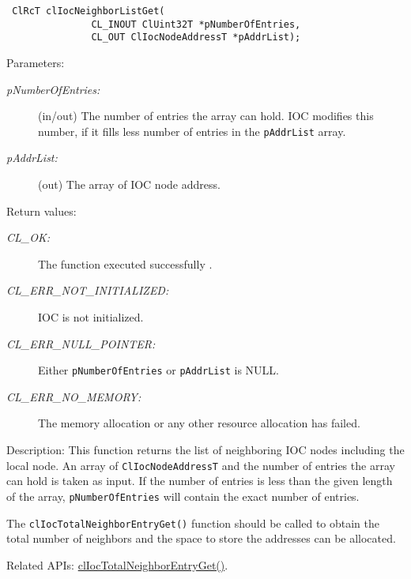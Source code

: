 \begin{flushleft}
\begin{Desc}
\footnotesize\begin{verbatim} ClRcT clIocNeighborListGet( 
               CL_INOUT ClUint32T *pNumberOfEntries, 
               CL_OUT ClIocNodeAddressT *pAddrList); 
\end{verbatim}
\normalsize
\end{Desc}
\begin{Desc}
\item[Parameters:]
\begin{description}
\item[{\em p\-Number\-Of\-Entries:}](in/out) The number of entries the array can hold. IOC modifies this number, if it fills less
number of entries in the {\tt{p\-Addr\-List}} array.
\item[{\em p\-Addr\-List:}](out) The array of IOC node address.\end{description}
\end{Desc}
\begin{Desc}
\item[Return values:]
\begin{description}
\item[{\em CL\_\-OK:}]The function executed successfully . \item[{\em CL\_\-ERR\_\-NOT\_\-INITIALIZED:}] IOC is not initialized. 
\item[{\em CL\_\-ERR\_\-NULL\_\-POINTER:}]Either {\tt{p\-Number\-Of\-Entries}} or {\tt{p\-Addr\-List}} is NULL. 
\item[{\em CL\_\-ERR\_\-NO\_\-MEMORY:}]The memory allocation or any other resource allocation has failed.\end{description}
\end{Desc}
\begin{Desc}
\item[Description:]This function returns the list of neighboring IOC nodes including the local node. An array of 
{\tt{Cl\-Ioc\-Node\-Address\-T}} and the number of entries the array can hold is taken as input. 
If the number of entries is less than the given length of the array, {\tt{p\-Number\-Of\-Entries}} will contain the exact number of entries.
\par
The {\tt{clIocTotalNeighborEntryGet()}} function should be called to obtain the total number of neighbors and 
the space to store the addresses can be allocated.\end{Desc}

\begin{Desc}
\item[Related APIs:]\hyperlink{pageIOC122}{clIocTotalNeighborEntryGet()}. \end{Desc}


\end{flushleft}
